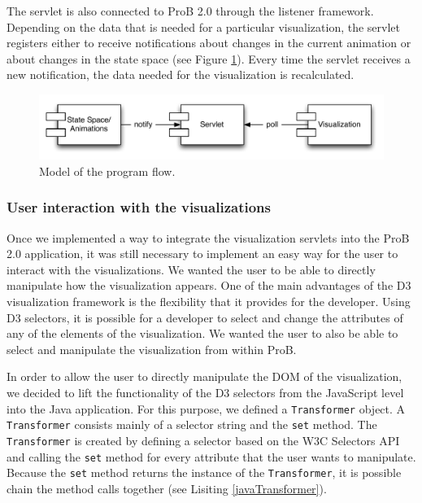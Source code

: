 The servlet is also connected to ProB 2.0 through the listener framework. Depending on the data that is needed for a particular visualization, the servlet registers either to receive notifications about changes in the current animation or about changes in the state space (see Figure \ref{programFlow}). Every time the servlet receives a new notification, the data needed for the visualization is recalculated.

\begin{center}
\begin{figure}[h!]
\centering
\includegraphics[width=14cm]{bilder/programFlow.pdf}
\caption{Model of the program flow.}
\label{programFlow}
\end{figure}
\end{center}

\subsubsection{User interaction with the visualizations}

Once we implemented a way to integrate the visualization servlets into the ProB 2.0 application, it was still necessary to implement an easy way for the user to interact with the visualizations. We wanted the user to be able to directly manipulate how the visualization appears. One of the main advantages of the D3 visualization framework is the flexibility that it provides for the developer. Using D3 selectors, it is possible for a developer to select and change the attributes of any of the elements of the visualization. We wanted the user to also be able to select and manipulate the visualization from within ProB. 

In order to allow the user to directly manipulate the DOM of the visualization, we decided to lift the functionality of the D3 selectors from the JavaScript level into the Java application. For this purpose, we defined a \texttt{Transformer} object. A \texttt{Transformer} consists mainly of a selector string and the \texttt{set} method. The \texttt{Transformer} is created by defining a selector based on the W3C Selectors API and calling the \texttt{set} method for every attribute that the user wants to manipulate. Because the \texttt{set} method returns the instance of the \texttt{Transformer}, it is possible chain the method calls together (see Lisiting \ref{javaTransformer}).

